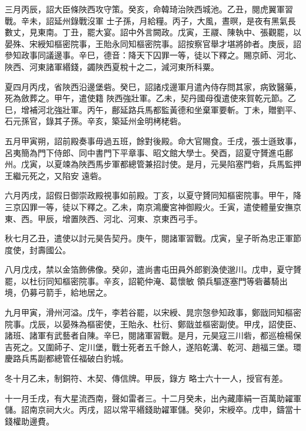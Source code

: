 \begin{pinyinscope}
 三月丙辰，詔大臣條陜西攻守策。癸亥，命韓琦治陜西城池。乙丑，閱虎翼軍習戰。辛未，詔延州錄戰沒軍
 士子孫，月給糧。丙子，大風，晝暝，是夜有黑氣長數丈，見東南。丁丑，罷大宴。詔中外言闕政。戊寅，王鬷、陳執中、張觀罷，以晏殊、宋綬知樞密院事，王貽永同知樞密院事。詔按察官舉才堪將帥者。庚辰，詔參知政事同議邊事。辛巳，德音：降天下囚罪一等，徒以下釋之。賜京師、河北、陜西、河東諸軍緡錢，蠲陜西夏稅十之二，減河東所科粟。



 夏四月丙戌，省陜西沿邊堡砦。癸巳，詔諸戍邊軍月遣內侍存問其家，病致醫藥，死為斂葬之。甲午，遣使籍
 陜西強壯軍。乙未，契丹國母復遣使來賀乾元節。乙巳，增補河北強壯軍。丙午，鄜延路兵馬都監黃德和坐棄軍要斬。丁未，贈劉平、石元孫官，錄其子孫。辛亥，築延州金明栲栳砦。



 五月甲寅朔，詔前殿奏事毋過五班，餘對後殿。命大官賜食。壬戌，張士遜致事，呂夷簡為門下侍郎、同中書門下平章事、昭文館大學士。癸酉，詔夏守贇進屯鄜州。戊寅，以夏竦為陜西馬步軍都總管兼招討使。是月，元昊陷塞門砦，兵馬監押王繼元死之，又陷安
 遠砦。



 六月丙戌，詔假日御崇政殿視事如前殿。丁亥，以夏守贇同知樞密院事。甲午，降三京囚罪一等，徒以下釋之。乙未，南京鴻慶宮神御殿火。壬寅，遣使體量安撫京東、西。甲辰，增置陜西、河北、河東、京東西弓手。



 秋七月乙丑，遣使以討元昊告契丹。庚午，閱諸軍習戰。戊寅，皇子昕為忠正軍節度使，封壽國公。



 八月戊戌，禁以金箔飾佛像。癸卯，遣尚書屯田員外郎劉渙使邈川。戊申，夏守贇罷，以杜衍同知樞密院事。辛亥，詔範仲淹、葛懷敏
 領兵驅逐塞門等砦蕃騎出境，仍募弓箭手，給地居之。



 九月甲寅，滑州河溢。戊午，李若谷罷，以宋綬、晁宗愨參知政事，鄭戩同知樞密院事。戊辰，以晏殊為樞密使，王貽永、杜衍、鄭戩並樞密副使。甲戌，詔使臣、諸班、諸軍有武藝者自陳。辛巳，閱諸軍習戰。是月，元昊寇三川砦，都巡檢楊保吉死之。又圍師子、定川堡，戰士死者五千餘人，遂陷乾溝、乾河、趙福三堡。環慶路兵馬副都總管任福破白豹城。



 冬十月乙未，制銅符、木契、傳信牌。甲辰，錄方
 略士六十一人，授官有差。



 十一月壬戌，有大星流西南，聲如雷者三。十二月癸未，出內藏庫絹一百萬助糴軍儲。詔南京祠大火。丙戌，詔以常平緡錢助糴軍儲。癸卯，宋綬卒。戊申，鑄當十錢權助邊費。



\end{pinyinscope}